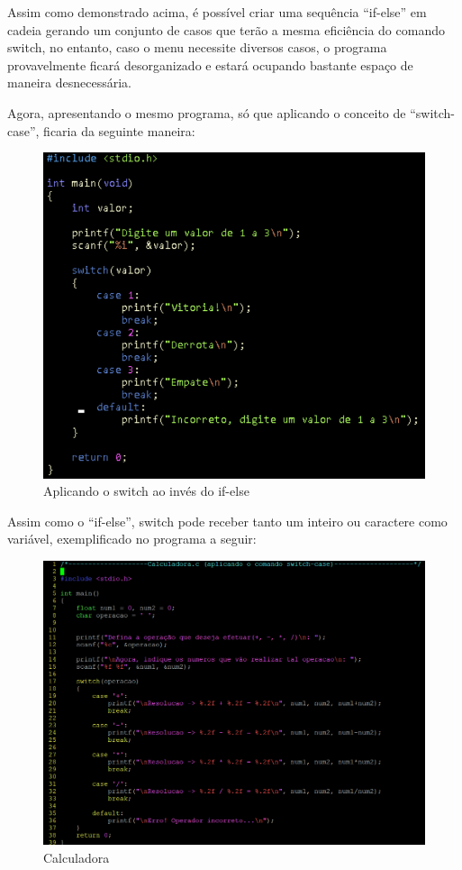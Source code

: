 \documentclass[a4paper,10pt]{article}  %
\begin{document}
   Assim como demonstrado acima, é possível criar uma sequência “if-else” em cadeia gerando um conjunto de casos que terão a mesma eficiência do comando switch, no entanto, caso o menu necessite diversos casos, o programa provavelmente ficará desorganizado e estará ocupando bastante espaço de maneira desnecessária. \par
   

    Agora, apresentando o mesmo programa, só que aplicando o conceito de “switch-case”, ficaria da seguinte maneira:

\begin{figure}[H]
 \centering
 \includegraphics[width=.80\linewidth]{imagens/ex3.png}
 \caption{Aplicando o switch ao invés do if-else}
\end{figure}



   Assim como o “if-else”, switch pode receber tanto um inteiro ou caractere como variável, exemplificado no programa a seguir:

\begin{figure}[H]
 \centering
 \includegraphics[width=.80\linewidth]{imagens/ex4.png}
 \caption{Calculadora} %
 \label{fig:xsort}
\end{figure}
\end{document}
